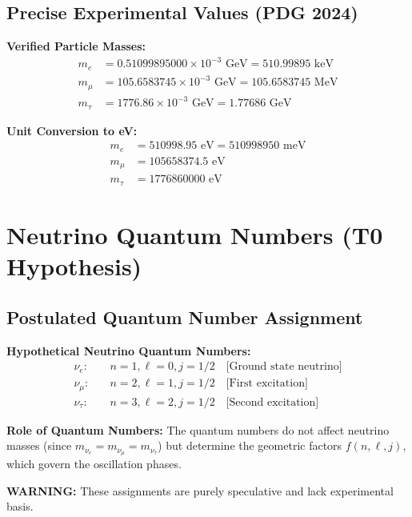 	\subsection{Precise Experimental Values (PDG 2024)}
	
	\begin{experimental}
		\textbf{Verified Particle Masses:}
		\begin{align}
			m_e &= 0.51099895000 \times 10^{-3} \text{ GeV} = 510.99895 \text{ keV} \\
			m_\mu &= 105.6583745 \times 10^{-3} \text{ GeV} = 105.6583745 \text{ MeV} \\
			m_\tau &= 1776.86 \times 10^{-3} \text{ GeV} = 1.77686 \text{ GeV}
		\end{align}
		
		\textbf{Unit Conversion to eV:}
		\begin{align}
			m_e &= 510998.95 \text{ eV} = 510998950 \text{ meV} \\
			m_\mu &= 105658374.5 \text{ eV} \\
			m_\tau &= 1776860000 \text{ eV}
		\end{align}
	\end{experimental}
	
	\section{Neutrino Quantum Numbers (T0 Hypothesis)}
	
	\subsection{Postulated Quantum Number Assignment}
	
	\begin{speculation}
		\textbf{Hypothetical Neutrino Quantum Numbers:}
		\begin{align}
			\nu_e: &\quad n=1, \ell=0, j=1/2 \quad \text{[Ground state neutrino]} \\
			\nu_\mu: &\quad n=2, \ell=1, j=1/2 \quad \text{[First excitation]} \\
			\nu_\tau: &\quad n=3, \ell=2, j=1/2 \quad \text{[Second excitation]}
		\end{align}
		
		\textbf{Role of Quantum Numbers:}
		The quantum numbers do not affect neutrino masses (since \(m_{\nu_e} = m_{\nu_\mu} = m_{\nu_\tau}\)) but determine the geometric factors \(f(n, \ell, j)\), which govern the oscillation phases.
		
		\textbf{WARNING:} These assignments are purely speculative and lack experimental basis.
	\end{speculation}
	
